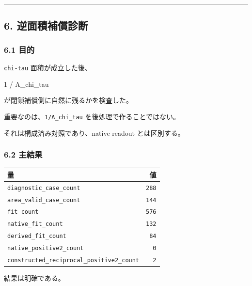 \documentclass[
]{article}
\newenvironment{Shaded}{}{}
\newcommand{\NormalTok}[1]{#1}
\newcounter{none} %
\begin{document}
\begin{center}\rule{0.5\linewidth}{0.5pt}\end{center}

\subsection{6.
逆面積補償診断}\label{ux9006ux9762ux7a4dux88dcux511fux8a3aux65ad}

\subsubsection{6.1 目的}\label{ux76eeux7684}

\texttt{chi-tau} 面積が成立した後、

\begin{Shaded}
\begin{Highlighting}[]
\NormalTok{1 / A\_chi\_tau}
\end{Highlighting}
\end{Shaded}

が閉鎖補償側に自然に残るかを検査した。

重要なのは、\texttt{1/A\_chi\_tau} を後処理で作ることではない。

それは構成済み対照であり、native readout とは区別する。

\subsubsection{6.2 主結果}\label{ux4e3bux7d50ux679c-4}

{\def\LTcaptype{none} %
\begin{longtable}[]{@{}lr@{}}
\toprule\noalign{}
量 & 値 \\
\midrule\noalign{}
\endhead
\bottomrule\noalign{}
\endlastfoot
\texttt{diagnostic\_case\_count} & \texttt{288} \\
\texttt{area\_valid\_case\_count} & \texttt{144} \\
\texttt{fit\_count} & \texttt{576} \\
\texttt{native\_fit\_count} & \texttt{132} \\
\texttt{derived\_fit\_count} & \texttt{84} \\
\texttt{native\_positive2\_count} & \texttt{0} \\
\texttt{constructed\_reciprocal\_positive2\_count} & \texttt{2} \\
\end{longtable}
}

結果は明確である。
\end{document}
